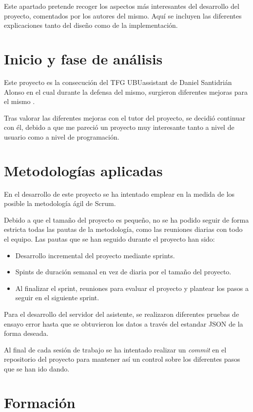 
Este apartado pretende recoger los aspectos más interesantes del desarrollo del proyecto, comentados por los autores del mismo. Aquí se incluyen las diferentes explicaciones tanto del diseño como de la implementación.

\section{Inicio y fase de análisis}
Este proyecto es la consecución del TFG UBUassistant de Daniel Santidrián Alonso en el cual durante la defensa del mismo, surgieron diferentes mejoras para el mismo \cite{tfg:art}.

Tras valorar las diferentes mejoras con el tutor del proyecto, se decidió continuar con él, debido a que me pareció un proyecto muy interesante tanto a nivel de usuario como a nivel de programación.

\section{Metodologías aplicadas}
En el desarrollo de este proyecto se ha intentado emplear en la medida de los posible la metodología ágil de Scrum.

Debido a que el tamaño del proyecto es pequeño, no se ha podido seguir de forma estricta todas las pautas de la metodología, como las reuniones diarias con todo el equipo. Las pautas que se han seguido durante el proyecto han sido:
\begin{itemize}
	\tightlist
	\item
	Desarrollo incremental del proyecto mediante sprints.
	\item
	Spints de duración semanal en vez de diaria por el tamaño del proyecto.
	\item
	Al finalizar el sprint, reuniones para evaluar el proyecto y plantear los pasos a seguir en el siguiente sprint.
\end{itemize}

Para el desarrollo del servidor del asistente, se realizaron diferentes pruebas de ensayo error hasta que se obtuvieron los datos a través del estandar JSON de la forma deseada.

Al final de cada sesión de trabajo se ha intentado realizar un \textit{commit} en el repositorio del proyecto para mantener así un control sobre los diferentes pasos que se han ido dando.

\section{Formación}

